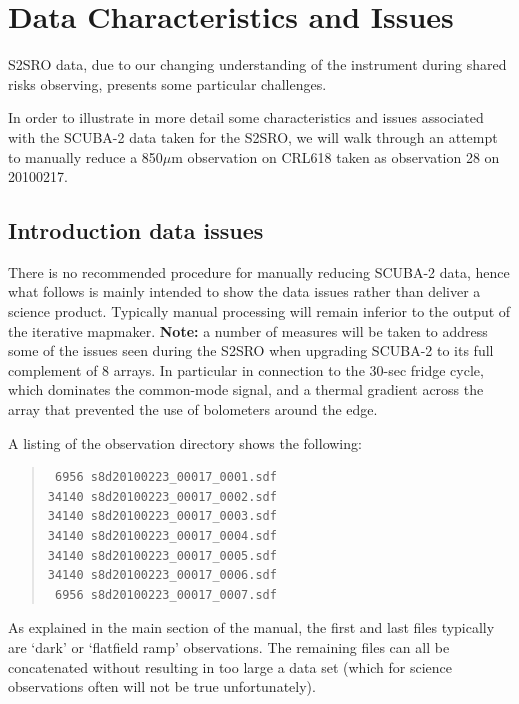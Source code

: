 \documentclass[twoside,11pt]{article}
\newcommand{\xlabel}[1]{}
\renewcommand{\_}{\texttt{\symbol{95}}}
\newenvironment{myquote}{\begin{quote}\begin{small}}{\end{small}\end{quote}}
\begin{document}
\newpage
\appendix

\section{\xlabel{Dataissues}Data Characteristics and Issues}
\label{sec:Issues}

S2SRO data, due to our changing understanding of the instrument during
shared risks observing, presents some particular challenges.

In order to illustrate in more detail some characteristics and issues
associated with the SCUBA-2 data taken for the S2SRO, we will walk
through an attempt to manually reduce a 850$\mu$m observation on CRL618
taken as observation 28 on 20100217.

\subsection{\xlabel{intro2}Introduction data issues}
\label{sec:intro2}

There is no recommended procedure for manually reducing SCUBA-2 data,
hence what follows is mainly intended to show the data issues rather
than deliver a science product. Typically manual processing will
remain inferior to the output of the iterative mapmaker. {\bf Note:}
a number of measures will be taken to address some of the issues seen
during the S2SRO when upgrading SCUBA-2 to its full complement of 8
arrays. In particular in connection to the 30-sec fridge cycle, which
dominates the common-mode signal, and a thermal gradient across the
array that prevented the use of bolometers around the edge.

A listing of the observation directory shows the following:

\begin{myquote}
\begin{verbatim}
 6956 s8d20100223_00017_0001.sdf
34140 s8d20100223_00017_0002.sdf
34140 s8d20100223_00017_0003.sdf
34140 s8d20100223_00017_0004.sdf
34140 s8d20100223_00017_0005.sdf
34140 s8d20100223_00017_0006.sdf
 6956 s8d20100223_00017_0007.sdf
\end{verbatim}
\end{myquote}

As explained in the main section of the manual, the first and last
files typically are `dark' or `flatfield ramp' observations. The
remaining files can all be concatenated without resulting in too large
a data set (which for science observations often will not be true
unfortunately).
\end{document}
